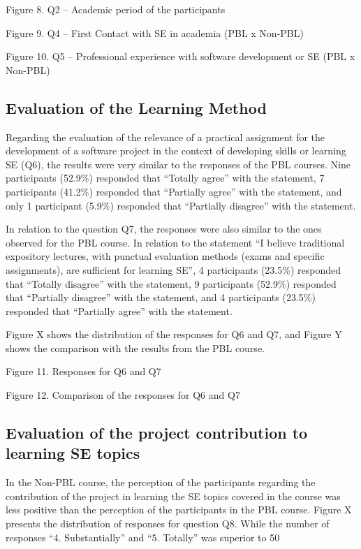 Figure 8. Q2 – Academic period of the participants
 
Figure 9. Q4 – First Contact with SE in academia (PBL x Non-PBL)
 
Figure 10. Q5 – Professional experience with software development or SE (PBL x Non-PBL)

\subsection{Evaluation of the Learning Method}

Regarding the evaluation of the relevance of a practical assignment for the development of a software project in the context of developing skills or learning SE (Q6), the results were very similar to the responses of the PBL courses. Nine participants (52.9\%) responded that “Totally agree” with the statement, 7 participants (41.2\%) responded that “Partially agree” with the statement, and only 1 participant (5.9\%) responded that “Partially disagree” with the statement.

In relation to the question Q7, the responses were also similar to the ones observed for the PBL course. In relation to the statement “I believe traditional expository lectures, with punctual evaluation methods (exams and specific assignments), are sufficient for learning SE”, 4 participants (23.5\%) responded that “Totally disagree” with the statement,  9 participants (52.9\%) responded that “Partially disagree” with the statement, and 4 participants (23.5\%) responded that “Partially agree” with the statement.

Figure X shows the distribution of the responses for Q6 and Q7, and Figure Y shows the comparison with the results from the PBL course.
 
Figure 11. Responses for Q6 and Q7
 
Figure 12. Comparison of the responses for Q6 and Q7

\subsection{Evaluation of the project contribution to learning SE topics}

In the Non-PBL course, the perception of the participants regarding the contribution of the project in learning the SE topics covered in the course was less positive than the perception of the participants in the PBL course. Figure X presents the distribution of responses for question Q8. While the number of responses “4. Substantially” and “5. Totally” was superior to 50%
 
